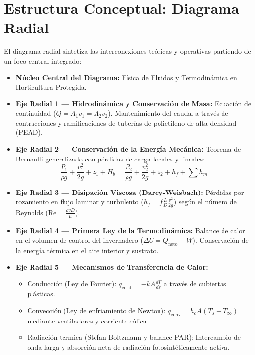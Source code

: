 \documentclass[12pt,spanish,letterpaper,oneside]{article}
\begin{document}
\section{Estructura Conceptual: Diagrama Radial}
El diagrama radial sintetiza las interconexiones teóricas y operativas partiendo de un foco central integrado:
\begin{itemize}
    \item \textbf{Núcleo Central del Diagrama:} Física de Fluidos y Termodinámica en Horticultura Protegida.
    \item \textbf{Eje Radial 1 --- Hidrodinámica y Conservación de Masa:} Ecuación de continuidad ($Q = A_1 v_1 = A_2 v_2$). Mantenimiento del caudal a través de contracciones y ramificaciones de tuberías de polietileno de alta densidad (PEAD).
    \item \textbf{Eje Radial 2 --- Conservación de la Energía Mecánica:} Teorema de Bernoulli generalizado con pérdidas de carga locales y lineales:
    \begin{equation}
        \frac{P_1}{\rho g} + \frac{v_1^2}{2g} + z_1 + H_b = \frac{P_2}{\rho g} + \frac{v_2^2}{2g} + z_2 + h_f + \sum h_m
    \end{equation}
    \item \textbf{Eje Radial 3 --- Disipación Viscosa (Darcy-Weisbach):} Pérdidas por rozamiento en flujo laminar y turbulento ($h_f = f \frac{L}{D} \frac{v^2}{2g}$) según el número de Reynolds ($\mathrm{Re} = \frac{\rho v D}{\mu}$).
    \item \textbf{Eje Radial 4 --- Primera Ley de la Termodinámica:} Balance de calor en el volumen de control del invernadero ($\Delta U = Q_{\text{neto}} - W$). Conservación de la energía térmica en el aire interior y sustrato.
    \item \textbf{Eje Radial 5 --- Mecanismos de Transferencia de Calor:}
    \begin{itemize}
        \item Conducción (Ley de Fourier): $q_{\text{cond}} = -k A \frac{dT}{dx}$ a través de cubiertas plásticas.
        \item Convección (Ley de enfriamiento de Newton): $q_{\text{conv}} = h_c A (T_s - T_\infty)$ mediante ventiladores y corriente eólica.
        \item Radiación térmica (Stefan-Boltzmann y balance PAR): Intercambio de onda larga y absorción neta de radiación fotosintéticamente activa.
    \end{itemize}
\end{itemize}
\end{document}
